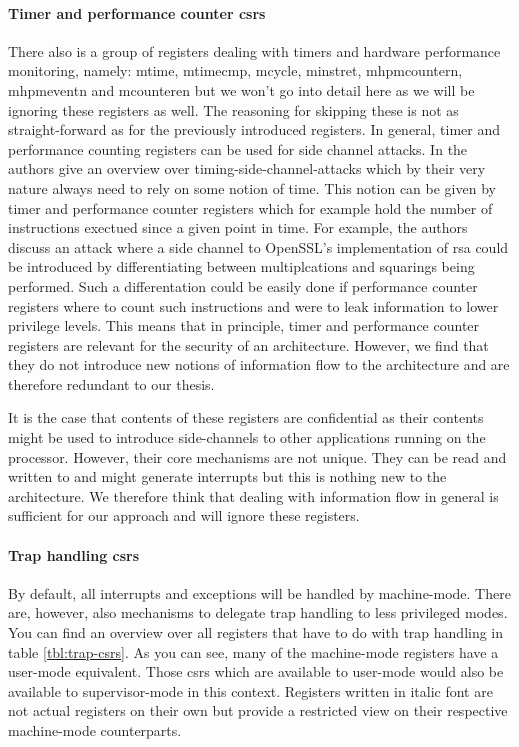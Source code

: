 \paragraph{Timer and performance counter \glspl{csr}}
There also is a group of registers dealing with timers and hardware performance monitoring, namely: \gls{mtime}, \gls{mtimecmp}, \gls{mcycle}, \gls{minstret}, \gls{mhpmcountern}, \gls{mhpmeventn} and \gls{mcounteren} but we won't go into detail here as we will be ignoring these registers as well.
The reasoning for skipping these is not as straight-forward as for the previously introduced registers.
In general, timer and performance counting registers can be used for side channel attacks.
In \cite{Qian16} the authors give an overview over timing-side-channel-attacks which by their very nature always need to rely on some notion of time.
This notion can be given by timer and performance counter registers which for example hold the number of instructions exectued since a given point in time.
For example, the authors discuss an attack where a side channel to OpenSSL's implementation of \gls{rsa} could be introduced by differentiating between multiplcations and squarings being performed.
Such a differentation could be easily done if performance counter registers where to count such instructions and were to leak information to lower privilege levels.
This means that in principle, timer and performance counter registers are relevant for the security of an architecture.
However, we find that they do not introduce new notions of information flow to the architecture and are therefore redundant to our thesis.

It is the case that contents of these registers are confidential as their contents might be used to introduce side-channels to other applications running on the processor.
However, their core mechanisms are not unique.
They can be read and written to and might generate interrupts but this is nothing new to the architecture.
We therefore think that dealing with information flow in general is sufficient for our approach and will ignore these registers.

\paragraph{Trap handling \glspl{csr}}
\label{par:trap-csrs}
By default, all interrupts and exceptions will be handled by machine-mode.
There are, however, also mechanisms to delegate trap handling to less privileged modes.
You can find an overview over all registers that have to do with trap handling in table \ref{tbl:trap-csrs}.
As you can see, many of the machine-mode registers have a user-mode equivalent.
Those \glspl{csr} which are available to user-mode would also be available to supervisor-mode in this context.
Registers written in italic font are not actual registers on their own but provide a restricted view on their respective machine-mode counterparts.

